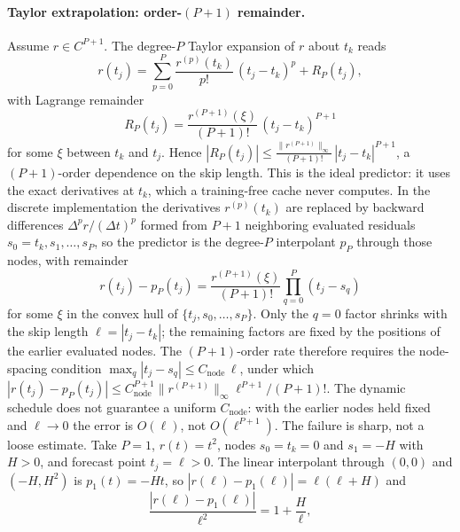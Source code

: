 \paragraph{Taylor extrapolation: order-$(P{+}1)$ remainder.}
\label{app:taylor}
Assume $r \in C^{P+1}$. The degree-$P$ Taylor expansion of $r$ about
$t_k$ reads
\begin{equation}
  r(t_j)
  = \sum_{p=0}^{P} \frac{r^{(p)}(t_k)}{p!}\,(t_j-t_k)^p
  + R_P(t_j),
\end{equation}
with Lagrange remainder
\begin{equation}
  R_P(t_j)
  = \frac{r^{(P+1)}(\xi)}{(P{+}1)!}\,(t_j-t_k)^{P+1}
\end{equation}
for some $\xi$ between $t_k$ and $t_j$. Hence
$|R_P(t_j)| \le \frac{\|r^{(P+1)}\|_\infty}{(P{+}1)!}\,|t_j-t_k|^{P+1}$,
a $(P{+}1)$-order dependence on the skip length. This is the ideal
predictor: it uses the exact derivatives at $t_k$, which a
training-free cache never computes. In the discrete implementation the
derivatives $r^{(p)}(t_k)$ are replaced by backward differences
$\Delta^p r/(\Delta t)^p$ formed from $P{+}1$ neighboring evaluated
residuals $s_0 {=} t_k, s_1, \dots, s_P$, so the predictor is the
degree-$P$ interpolant $p_P$ through those nodes, with remainder
\begin{equation}
  r(t_j) - p_P(t_j)
  = \frac{r^{(P+1)}(\xi)}{(P{+}1)!}\prod_{q=0}^{P}(t_j - s_q)
  \label{eq:app-interp}
\end{equation}
for some $\xi$ in the convex hull of $\{t_j, s_0, \dots, s_P\}$. Only
the $q{=}0$ factor shrinks with the skip length
$\ell = |t_j - t_k|$; the remaining factors are fixed by the positions
of the earlier evaluated nodes. The $(P{+}1)$-order rate therefore
requires the node-spacing condition
$\max_q |t_j - s_q| \le C_{\mathrm{node}}\,\ell$, under which
$|r(t_j) - p_P(t_j)| \le C_{\mathrm{node}}^{P+1}
\|r^{(P+1)}\|_\infty \ell^{P+1}/(P{+}1)!$. The dynamic schedule does
not guarantee a uniform $C_{\mathrm{node}}$: with the earlier nodes
held fixed and $\ell \to 0$ the error is $O(\ell)$, not
$O(\ell^{P+1})$. The failure is sharp, not a loose estimate. Take
$P = 1$, $r(t) = t^2$, nodes $s_0 = t_k = 0$ and $s_1 = -H$ with
$H > 0$, and forecast point $t_j = \ell > 0$. The linear interpolant
through $(0,0)$ and $(-H,H^2)$ is $p_1(t) = -Ht$, so
$|r(\ell) - p_1(\ell)| = \ell(\ell + H)$ and
\begin{equation}
  \frac{|r(\ell) - p_1(\ell)|}{\ell^2} = 1 + \frac{H}{\ell},
  \label{eq:app-counterexample}
\end{equation}
